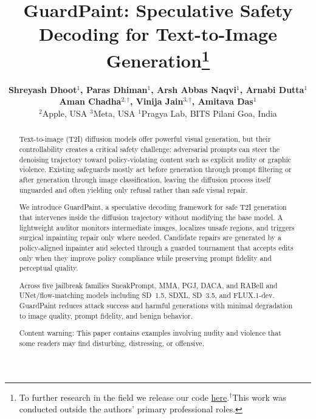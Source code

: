 \documentclass[11pt]{article}
\title{
GuardPaint: Speculative Safety Decoding for Text-to-Image Generation\thanks{To further research in the field we release our code  \href{https://anonymous.4open.science/r/TiPAI-TSPO-D186/README.md}{here}.$^{\dagger}$This work was conducted outside the authors’ primary
professional roles.}
}
\author{
\textbf{
Shreyash Dhoot$^{1}$,
Paras Dhiman$^{1}$,
Arsh Abbas Naqvi$^{1}$,
Arnabi Dutta$^{1}$
}\\
\textbf{
Aman Chadha$^{2,\dagger}$,
Vinija Jain$^{3,\dagger}$,
Amitava Das$^{1}$
}\\[4pt]
\normalfont
$^{2}$Apple, USA \quad
$^{3}$Meta, USA  \quad
$^{1}$Pragya Lab, BITS Pilani Goa, India 
}
\begin{document}
\maketitle

\begin{abstract}

Text-to-image (T2I) diffusion models offer powerful visual generation, but their controllability creates a critical safety challenge: adversarial prompts can steer the denoising trajectory toward policy-violating content such as explicit nudity or graphic violence. Existing safeguards mostly act before generation through prompt filtering or after generation through image classification, leaving the diffusion process itself unguarded and often yielding only refusal rather than safe visual repair.

We introduce GuardPaint, a speculative decoding framework for safe T2I generation that intervenes inside the diffusion trajectory without modifying the base model. A lightweight auditor monitors intermediate images, localizes unsafe regions, and triggers surgical inpainting repair only where needed. Candidate repairs are generated by a policy-aligned inpainter and selected through a guarded tournament that accepts edits only when they improve policy compliance while preserving prompt fidelity and perceptual quality.

Across five jailbreak families SneakPrompt, MMA, PGJ, DACA, and RABell and UNet/flow-matching models including SD~1.5, SDXL, SD~3.5, and FLUX.1-dev. GuardPaint reduces attack success and harmful generations with minimal degradation to image quality, prompt fidelity, and benign behavior.

Content warning: This paper contains examples involving nudity and violence that some readers may find disturbing, distressing, or offensive.

\end{abstract}
\end{document}
